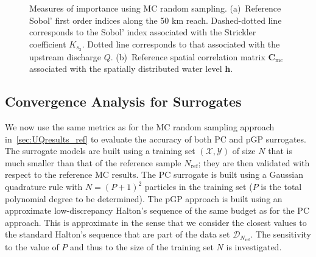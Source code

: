 \begin{figure}[!h]               
\centering
{} 
\caption{Measures of importance using MC random sampling. (a)~Reference Sobol' first order indices along the 50 km reach. Dashed-dotted line corresponds to the Sobol' index associated with the Strickler coefficient $K_{s_3}$. Dotted line corresponds to that associated with the upstream discharge $Q$. (b)~Reference spatial correlation matrix $\mathbf{C}_{\text{mc}}$ associated with the spatially distributed water level $\mathbf{h}$.}
\label{fig:monte-carlo_sobol_corr}
\end{figure}

\subsection{Convergence Analysis for Surrogates}

We now use the same metrics as for the MC random sampling approach in~\cref{sec:UQresults_ref} to evaluate the accuracy of both PC and pGP surrogates. The surrogate models are built using a training set $(\mathcal{X}, \mathcal{Y})$ of size $N$ that is much smaller than that of the reference sample $N_{\text{ref}}$; they are then validated with respect to the reference MC results. The PC surrogate is built using a Gaussian quadrature rule with $N = (P+1)^2$ particles in the training set ($P$ is the total polynomial degree to be determined). The pGP approach is built using an approximate low-discrepancy Halton's sequence of the same budget as for the PC approach. This is approximate in the sense that we consider the closest values to the standard Halton's sequence that are part of the data set $\mathcal{D}_{N_{\text{ref}}}$. The sensitivity to the value of $P$ and thus to the size of the training set $N$ is investigated.

